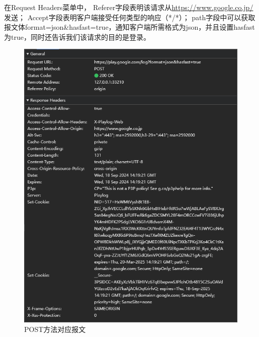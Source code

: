 在Request Headers菜单中， 
Referer字段表明该请求从\url{https://www.google.co.jp/}发送；
Accept字段表明客户端接受任何类型的响应（*/*）；
path字段中可以获取报文体format=json\&hasfast=true，通知客户端所需格式为json，并且设置hasfast为true，同时还告诉我们该请求的目的是登录。
\begin{figure}[!htbp]
    \centering
    \includegraphics[width=\textwidth]{figures/POST1.png}
    \caption{POST方法对应报文}\label{POST1}
\end{figure}
